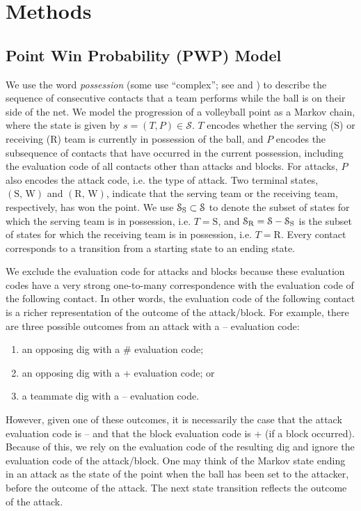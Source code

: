 \documentclass[USenglish]{article}
\theoremstyle{dgthm}
\theoremstyle{dgdef}
\begin{document}
\section{Methods}

\subsection{Point Win Probability (PWP) Model}
\label{sec:point-win-prob}

We use the word {\it possession} (some use ``complex''; see \textcite{hileno_etal_2020} and \textcite{laporta_etal_2015}) to describe the sequence of consecutive contacts that a team performs while the ball is on their side of the net. We model the progression of a volleyball point as a Markov chain, where the state is given by $s = (T, P) \in \mathcal{S}$. $T$ encodes whether the serving (S) or receiving (R) team is currently in possession of the ball, and $P$ encodes the subsequence of contacts that have occurred in the current possession, including the evaluation code of all contacts other than attacks and blocks. For attacks, $P$ also encodes the attack code, i.e. the type of attack. Two terminal states, $(\mbox{S, W})$ and $(\mbox{R, W})$, indicate that the serving team or the receiving team, respectively, has won the point. We use $\mathcal{S}_{\mbox{\scriptsize S}} \subset \mathcal{S}$ to denote the subset of states for which the serving team is in possession, i.e. $T = \mbox{S}$, and $\mathcal{S}_{\mbox{\scriptsize R}} = \mathcal{S} - \mathcal{S}_{\mbox{\scriptsize S}}$ is the subset of states for which the receiving team is in possession, i.e. $T = \mbox{R}$. Every contact corresponds to a transition from a starting state to an ending state.

We exclude the evaluation code for attacks and blocks because these evaluation codes have a very strong one-to-many correspondence with the evaluation code of the following contact. In other words, the evaluation code of the following contact is a richer representation of the outcome of the attack/block. For example, there are three possible outcomes from an attack with a -- evaluation code:
\begin{enumerate}
    \item an opposing dig with a \# evaluation code;
    \item an opposing dig with a + evaluation code; or
    \item a teammate dig with a -- evaluation code.
\end{enumerate}
However, given one of these outcomes, it is necessarily the case that the attack evaluation code is -- and that the block evaluation code is + (if a block occurred). Because of this, we rely on the evaluation code of the resulting dig and ignore the evaluation code of the attack/block. One may think of the Markov state ending in an attack as the state of the point when the ball has been set to the attacker, before the outcome of the attack. The next state transition reflects the outcome of the attack.
\end{document}
